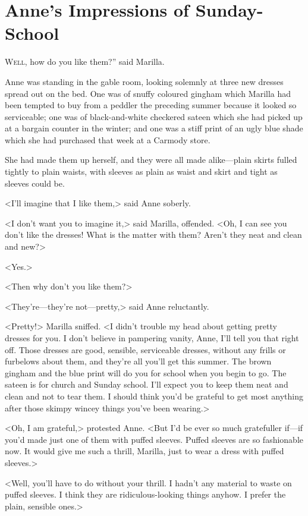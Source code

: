 \chapter{Anne's Impressions of Sunday-School}

\lettrine[ante=“,]{W}{ell}, how do you like them?” said Marilla.

\zz
Anne was standing in the gable room, looking solemnly at three new dresses spread out on the bed. One was of snuffy coloured gingham which Marilla had been tempted to buy from a peddler the preceding summer because it looked so serviceable; one was of black-and-white checkered sateen which she had picked up at a bargain counter in the winter; and one was a stiff print of an ugly blue shade which she had purchased that week at a Carmody store.

She had made them up herself, and they were all made alike—plain skirts fulled tightly to plain waists, with sleeves as plain as waist and skirt and tight as sleeves could be.

<I'll imagine that I like them,> said Anne soberly.

<I don't want you to imagine it,> said Marilla, offended. <Oh, I can see you don't like the dresses! What is the matter with them? Aren't they neat and clean and new?>

<Yes.>

<Then why don't you like them?>

<They're—they're not—pretty,> said Anne reluctantly.

<Pretty!> Marilla sniffed. <I didn't trouble my head about getting pretty dresses for you. I don't believe in pampering vanity, Anne, I'll tell you that right off. Those dresses are good, sensible, serviceable dresses, without any frills or furbelows about them, and they're all you'll get this summer. The brown gingham and the blue print will do you for school when you begin to go. The sateen is for church and Sunday school. I'll expect you to keep them neat and clean and not to tear them. I should think you'd be grateful to get most anything after those skimpy wincey things you've been wearing.>

<Oh, I am grateful,> protested Anne. <But I'd be ever so much gratefuller if—if you'd made just one of them with puffed sleeves. Puffed sleeves are so fashionable now. It would give me such a thrill, Marilla, just to wear a dress with puffed sleeves.>

<Well, you'll have to do without your thrill. I hadn't any material to waste on puffed sleeves. I think they are ridiculous-looking things anyhow. I prefer the plain, sensible ones.>


